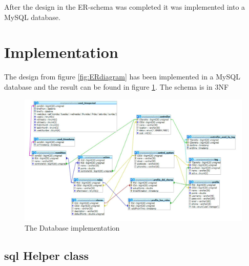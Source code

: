 After the design in the ER-schema was completed it was implemented into a MySQL database.  

\section{Implementation}

The design from figure \ref{fig:ERdiagram} has been implemented in a MySQL database and the result can be found in figure \ref{fig:databaseDiagram}. The schema is in 3NF
\begin{figure}
	\centering
		\includegraphics[width=1.00\textwidth]{images/databaseDiagram.jpg}
	\caption{The Database implementation}
	\label{fig:databaseDiagram}
\end{figure}





\subsection{sql Helper class}